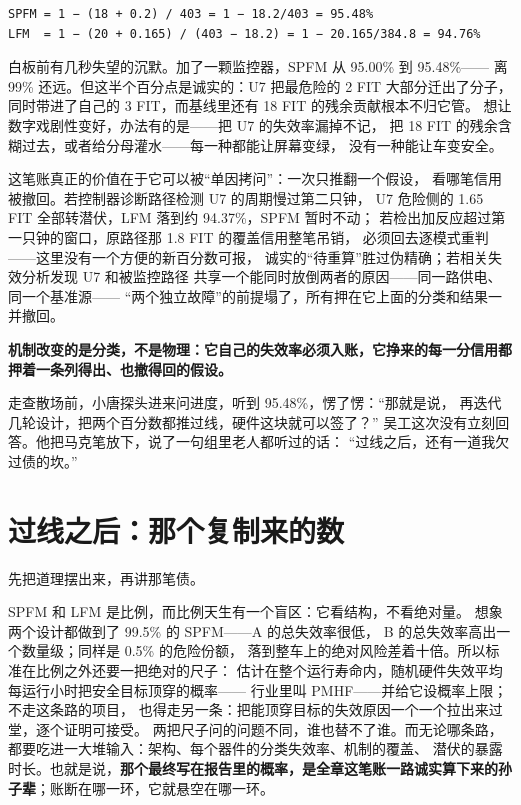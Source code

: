 \nopagebreak[4]
\begin{codebox}
\begin{Verbatim}[fontsize=\small,breaklines=true,breakanywhere=true,breaksymbolleft={},breaksymbolright={}]
SPFM = 1 − (18 + 0.2) / 403 = 1 − 18.2/403 = 95.48%
LFM  = 1 − (20 + 0.165) / (403 − 18.2) = 1 − 20.165/384.8 = 94.76%
\end{Verbatim}
\end{codebox}

白板前有几秒失望的沉默。加了一颗监控器，SPFM 从 95.00\% 到 95.48\%——
离 99\% 还远。但这半个百分点是诚实的：U7 把最危险的 2 FIT 大部分迁出了分子，
同时带进了自己的 3 FIT，而基线里还有 18 FIT 的残余贡献根本不归它管。
想让数字戏剧性变好，办法有的是——把 U7 的失效率漏掉不记，
把 18 FIT 的残余含糊过去，或者给分母灌水——每一种都能让屏幕变绿，
没有一种能让车变安全。

这笔账真正的价值在于它可以被“单因拷问”：一次只推翻一个假设，
看哪笔信用被撤回。若控制器诊断路径检测 U7 的周期慢过第二只钟，
U7 危险侧的 1.65 FIT 全部转潜伏，LFM 落到约 94.37\%，SPFM 暂时不动；
若检出加反应超过第一只钟的窗口，原路径那 1.8 FIT 的覆盖信用整笔吊销，
必须回去逐模式重判——这里没有一个方便的新百分数可报，
诚实的“待重算”胜过伪精确；若相关失效分析发现 U7 和被监控路径
共享一个能同时放倒两者的原因——同一路供电、同一个基准源——
“两个独立故障”的前提塌了，所有押在它上面的分类和结果一并撤回。

\textbf{机制改变的是分类，不是物理：它自己的失效率必须入账，它挣来的每一分信用都押着一条列得出、也撤得回的假设。}

走查散场前，小唐探头进来问进度，听到 95.48\%，愣了愣：“那就是说，
再迭代几轮设计，把两个百分数都推过线，硬件这块就可以签了？”
吴工这次没有立刻回答。他把马克笔放下，说了一句组里老人都听过的话：
“过线之后，还有一道我欠过债的坎。”

\section{过线之后：那个复制来的数}

先把道理摆出来，再讲那笔债。

SPFM 和 LFM 是比例，而比例天生有一个盲区：它看结构，不看绝对量。
想象两个设计都做到了 99.5\% 的 SPFM——A 的总失效率很低，
B 的总失效率高出一个数量级；同样是 0.5\% 的危险份额，
落到整车上的绝对风险差着十倍。所以标准在比例之外还要一把绝对的尺子：
估计在整个运行寿命内，随机硬件失效平均每运行小时把安全目标顶穿的概率——
行业里叫 PMHF——并给它设概率上限；不走这条路的项目，
也得走另一条：把能顶穿目标的失效原因一个一个拉出来过堂，逐个证明可接受。
两把尺子问的问题不同，谁也替不了谁。而无论哪条路，
都要吃进一大堆输入：架构、每个器件的分类失效率、机制的覆盖、
潜伏的暴露时长。也就是说，\textbf{那个最终写在报告里的概率，是全章这笔账一路诚实算下来的孙子辈}；账断在哪一环，它就悬空在哪一环。

